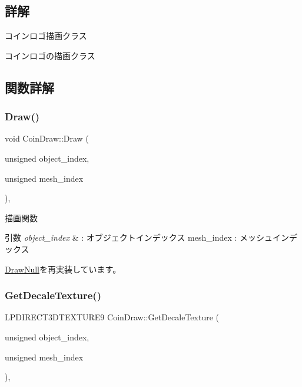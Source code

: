 \subsection{詳解}
コインロゴ描画クラス 

コインロゴの描画クラス 

\subsection{関数詳解}
\mbox{\label{class_coin_draw_ac7d91fecb6845cebe276eb81a4953563}} 
\subsubsection{\texorpdfstring{Draw()}{Draw()}}
{\footnotesize\ttfamily void Coin\+Draw\+::\+Draw (\begin{DoxyParamCaption}\item[{unsigned}]{object\+\_\+index,  }\item[{unsigned}]{mesh\+\_\+index }\end{DoxyParamCaption})\hspace{0.3cm}{\ttfamily [override]}, {\ttfamily [virtual]}}



描画関数 


\begin{DoxyParams}{引数}
{\em object\+\_\+index} & \+: オブジェクトインデックス mesh\+\_\+index \+: メッシュインデックス \\
\hline
\end{DoxyParams}


\mbox{\hyperlink{class_draw_null_afe50f6fd820b18d673f70f048743f339}{Draw\+Null}}を再実装しています。

\mbox{\label{class_coin_draw_a1d4ab1a5c480833b8d8e7fe226136ad5}} 
\subsubsection{\texorpdfstring{Get\+Decale\+Texture()}{GetDecaleTexture()}}
{\footnotesize\ttfamily L\+P\+D\+I\+R\+E\+C\+T3\+D\+T\+E\+X\+T\+U\+R\+E9 Coin\+Draw\+::\+Get\+Decale\+Texture (\begin{DoxyParamCaption}\item[{unsigned}]{object\+\_\+index,  }\item[{unsigned}]{mesh\+\_\+index }\end{DoxyParamCaption})\hspace{0.3cm}{\ttfamily [override]}, {\ttfamily [virtual]}}



